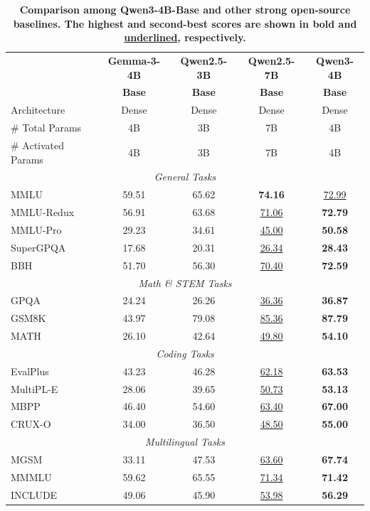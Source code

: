 \documentclass[dvipsnames]{article}
\begin{document}
\begin{table}[tbp]
\centering
\caption{\textbf{Comparison among Qwen3-4B-Base and other strong open-source baselines. The highest and second-best scores are shown in \textbf{bold} and \underline{underlined}, respectively.}}
\label{tab:base-4B}
\small 
\begin{tabular}{@{}lcccc@{}}
\toprule
 & \textbf{Gemma-3-4B} & \textbf{Qwen2.5-3B} & \textbf{Qwen2.5-7B} & \textbf{Qwen3-4B} \\
 & \textbf{Base} & \textbf{Base}& \textbf{Base}& \textbf{Base} \\
\midrule
Architecture & Dense & Dense & Dense & Dense\\
\# Total Params & 4B & 3B & 7B & 4B \\
\# Activated Params & 4B & 3B & 7B & 4B \\
\midrule
\multicolumn{5}{c}{\textit{General Tasks}} \\
\midrule
MMLU & 59.51 & 65.62 & \textbf{74.16} & \underline{72.99} \\
MMLU-Redux & 56.91 & 63.68 & \underline{71.06} & \textbf{72.79} \\
MMLU-Pro & 29.23 & 34.61 & \underline{45.00} & \textbf{50.58} \\
SuperGPQA & 17.68 & 20.31 & \underline{26.34} & \textbf{28.43} \\
BBH & 51.70 & 56.30 & \underline{70.40} & \textbf{72.59} \\
\midrule
\multicolumn{5}{c}{\textit{Math \& STEM Tasks}} \\
\midrule
GPQA & 24.24 & 26.26 & \underline{36.36} & \textbf{36.87} \\
GSM8K & 43.97 & 79.08 & \underline{85.36} & \textbf{87.79} \\
MATH & 26.10 & 42.64 & \underline{49.80} & \textbf{54.10} \\
\midrule
\multicolumn{5}{c}{\textit{Coding Tasks}} \\
\midrule
EvalPlus & 43.23 & 46.28 & \underline{62.18} & \textbf{63.53} \\
MultiPL-E & 28.06 & 39.65 & \underline{50.73} & \textbf{53.13} \\
MBPP & 46.40 & 54.60 & \underline{63.40} & \textbf{67.00} \\
CRUX-O & 34.00 & 36.50 & \underline{48.50} & \textbf{55.00} \\
\midrule
\multicolumn{5}{c}{\textit{Multilingual Tasks}} \\
\midrule
MGSM & 33.11 & 47.53 & \underline{63.60} & \textbf{67.74} \\
MMMLU & 59.62 & 65.55 & \underline{71.34} & \textbf{71.42} \\
INCLUDE & 49.06 & 45.90 & \underline{53.98} & \textbf{56.29} \\
\bottomrule
\end{tabular}
\end{table}
\end{document}
